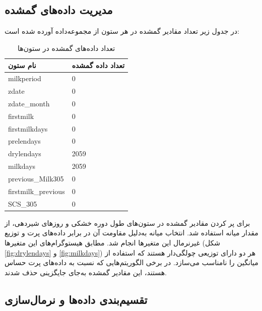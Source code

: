 \subsection{مدیریت داده‌های گمشده}

در جدول زیر تعداد مقادیر گمشده در هر ستون از مجموعه‌داده آورده شده است:

\begin{table}[H]
	\centering
	\caption{تعداد داده‌های گمشده در ستون‌ها}
	\renewcommand{\arraystretch}{1.3} %
	\begin{tabular}{
			>{\centering\arraybackslash}m{4cm} %
			>{\centering\arraybackslash}m{3cm} %
		}
		\toprule
		\textbf{نام ستون} & \textbf{تعداد داده گمشده} \\
		\midrule
		milkperiod & \num{0} \\
		zdate & \num{0} \\
		zdate\_month & \num{0} \\
		firstmilk & \num{0} \\
		firstmilkdays & \num{0} \\
		prelendays & \num{0} \\
		drylendays & \num{2059} \\
		milkdays & \num{2059} \\
		previous\_Milk305 & \num{0} \\
		firstmilk\_previous & \num{0} \\
		SCS\_305 & \num{0} \\
		\bottomrule
	\end{tabular}
	\label{tab:missing_data}
\end{table}

برای پر کردن مقادیر گمشده در ستون‌های طول دوره خشکی و روز‌های شیردهی، از مقدار میانه استفاده شد. انتخاب میانه به‌دلیل مقاومت آن در برابر داده‌های پرت و توزیع غیرنرمال این متغیرها انجام شد. مطابق هیستوگرام‌های این متغیرها (شکل \ref{fig:drylendays} و \ref{fig:milkdays}) هر دو دارای توزیعی چولگی‌دار هستند که استفاده از میانگین را نامناسب می‌سازد. در برخی الگوریتم‌هایی که نسبت به داده‌های پرت حساس هستند، این مقادیر گمشده به‌جای جایگزینی حذف شدند.


\subsection{تقسیم‌بندی داده‌ها و نرمال‌سازی}

